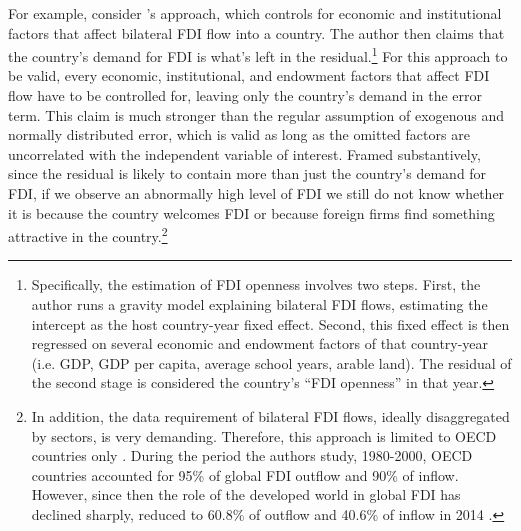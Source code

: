 For example, consider \citet{Pinto2008, Pinto2013}'s approach, which controls for economic and institutional factors that affect bilateral FDI flow into a country. The author then claims that the country's demand for FDI is what's left in the residual.\footnote{Specifically, the estimation of FDI openness involves two steps. First, the author runs a gravity model explaining bilateral FDI flows, estimating the intercept as the host country-year fixed effect. Second, this fixed effect is then regressed on several economic and endowment factors of that country-year (i.e. GDP, GDP per capita, average school years, arable land). The residual of the second stage is considered the country's ``FDI openness'' in that year.} For this approach to be valid, every economic, institutional, and endowment factors that affect FDI flow have to be controlled for, leaving only the country's demand in the error term. This claim is much stronger than the regular assumption of exogenous and normally distributed error, which is valid as long as the omitted factors are uncorrelated with the independent variable of interest. Framed substantively, since the residual is likely to contain more than just the country's demand for FDI, if we observe an abnormally high level of FDI we still do not know whether it is because the country welcomes FDI or because foreign firms find something attractive in the country.\footnote{In addition, the data requirement of bilateral FDI flows, ideally disaggregated by sectors, is very demanding. Therefore, this approach is limited to OECD countries only \citep{Pinto2008}. During the period the authors study, 1980-2000, OECD countries accounted for 95\% of global FDI outflow and 90\% of inflow. However, since then the role of the developed world in global FDI has declined sharply, reduced to 60.8\% of outflow and 40.6\% of inflow in 2014 \citep{UNCTAD2015}.}

